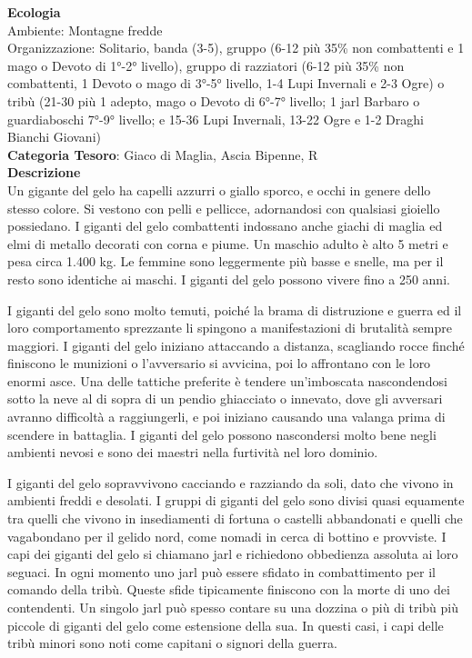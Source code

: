 \begin{multicols}{2}
{\textbf{Ecologia}\\
Ambiente: Montagne fredde\\
Organizzazione: Solitario, banda (3-5), gruppo (6-12 più 35\% non combattenti e 1 mago o Devoto di 1°-2° livello), gruppo di razziatori (6-12 più 35\% non combattenti, 1 Devoto o mago di 3°-5° livello, 1-4 Lupi Invernali e 2-3 Ogre) o tribù (21-30 più 1 adepto, mago o Devoto di 6°-7° livello; 1 jarl Barbaro o guardiaboschi 7°-9° livello; e 15-36 Lupi Invernali, 13-22 Ogre e 1-2 Draghi Bianchi Giovani)\\
\textbf{Categoria Tesoro}: Giaco di Maglia, Ascia Bipenne, R\\
\textbf{Descrizione}\\
Un gigante del gelo ha capelli azzurri o giallo sporco, e occhi in genere dello stesso colore. Si vestono con pelli e pellicce, adornandosi con qualsiasi gioiello possiedano. I giganti del gelo combattenti indossano anche giachi di maglia ed elmi di metallo decorati con corna e piume. Un maschio adulto è alto 5 metri e pesa circa 1.400 kg. Le femmine sono leggermente più basse e snelle, ma per il resto sono identiche ai maschi. I giganti del gelo possono vivere fino a 250 anni.

I giganti del gelo sono molto temuti, poiché la brama di distruzione e guerra ed il loro comportamento sprezzante li spingono a manifestazioni di brutalità sempre maggiori. I giganti del gelo iniziano attaccando a distanza, scagliando rocce finché finiscono le munizioni o l'avversario si avvicina, poi lo affrontano con le loro enormi asce. Una delle tattiche preferite è tendere un'imboscata nascondendosi sotto la neve al di sopra di un pendio ghiacciato o innevato, dove gli avversari avranno difficoltà a raggiungerli, e poi iniziano causando una valanga prima di scendere in battaglia. I giganti del gelo possono nascondersi molto bene negli ambienti nevosi e sono dei maestri nella furtività nel loro dominio.

I giganti del gelo sopravvivono cacciando e razziando da soli, dato che vivono in ambienti freddi e desolati. I gruppi di giganti del gelo sono divisi quasi equamente tra quelli che vivono in insediamenti di fortuna o castelli abbandonati e quelli che vagabondano per il gelido nord, come nomadi in cerca di bottino e provviste. I capi dei giganti del gelo si chiamano jarl e richiedono obbedienza assoluta ai loro seguaci. In ogni momento uno jarl può essere sfidato in combattimento per il comando della tribù. Queste sfide tipicamente finiscono con la morte di uno dei contendenti. Un singolo jarl può spesso contare su una dozzina o più di tribù più piccole di giganti del gelo come estensione della sua. In questi casi, i capi delle tribù minori sono noti come capitani o signori della guerra.

}
\end{multicols}
